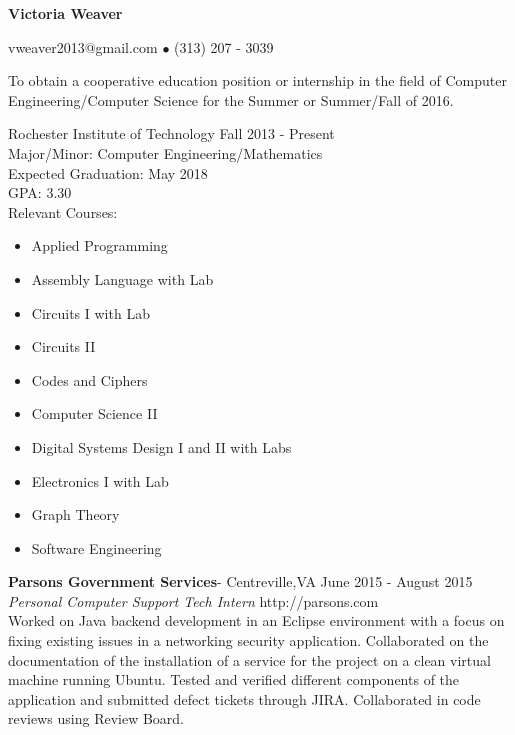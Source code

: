 \documentclass[10pt]{article} %
\begin{document}
	\centerline{\LARGE \bf Victoria Weaver}
	\centerline{vweaver2013@gmail.com $\bullet$ (313) 207 - 3039}
\noindent\makebox[\linewidth]{\rule{\textwidth}{1pt}}

\bigskip


\newline
	To obtain a cooperative education position or internship in the field of Computer Engineering/Computer Science for the Summer or Summer/Fall of 2016.


\bigskip


\newline
	Rochester Institute of Technology	\hfill Fall 2013 - Present
	\\ Major/Minor: Computer Engineering/Mathematics
	\\ Expected Graduation: May 2018
	\\ GPA: 3.30
	\\ Relevant Courses: \begin{multicols}{3}
		\begin{itemize}
			\itemsep0em 
			\item Applied Programming
			\item Assembly Language with Lab
			\item Circuits I with Lab
			\item Circuits II
			\item Codes and Ciphers
			\item Computer Science II
			\item Digital Systems Design I and II with Labs
			\item Electronics I with Lab
			\item Graph Theory
			\item Software Engineering
		\end{itemize}
		\end{multicols}



\newline
	\textbf{Parsons Government Services}- Centreville,VA			\hfill June 2015 - August 2015 \\
	\textit{Personal Computer Support Tech Intern}	\hfill http://parsons.com \\
	\indent Worked on Java backend development in an Eclipse environment with a focus on fixing existing issues in a networking security application.  Collaborated on the documentation of the installation of a service for the project on a clean virtual machine running Ubuntu.  Tested and verified different components of the application and submitted defect tickets through JIRA.  Collaborated in code reviews using Review Board.
	
\end{document}
